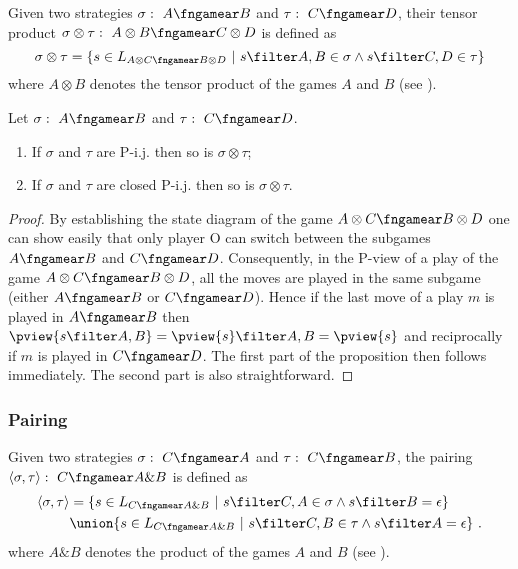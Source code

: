 Given two strategies $\sigma :\ A
\fngamear B$  and $\tau :\ C\fngamear D$, their tensor product
$\sigma \otimes \tau :\ A\otimes B \fngamear C\otimes D$ is defined
as
$$\sigma \otimes \tau = \{ s \in L_{A\otimes C \fngamear B\otimes
D} \ | \ s \filter A,B \in \sigma \wedge s \filter C,D \in \tau \} $$
 where $A\otimes B$ denotes the tensor product of the games $A$ and $B$ (see \cite{abramsky:game-semantics-tutorial}).
\begin{proposition}
Let $\sigma :\ A \fngamear B$  and $\tau :\ C\fngamear D$.
\begin{enumerate}
\item If $\sigma$ and $\tau$ are P-i.j.
then so is $\sigma \otimes \tau$;
\item If $\sigma$ and $\tau$ are closed P-i.j. then so is $\sigma \otimes \tau$.
\end{enumerate}
\end{proposition}

\begin{proof}
By establishing the state diagram of the game $A\otimes C \fngamear
B\otimes D$ one can show easily that only player O can switch
between the subgames $A\fngamear B$ and $C\fngamear D$.
Consequently, in the P-view of a play of the game $A\otimes C
\fngamear B\otimes D$, all the moves are played in the same subgame
(either $A\fngamear B$ or $C\fngamear D$). Hence if the last move of
a play $m$ is played in $A\fngamear B$ then $\pview{s\filter A,B} =
\pview{s} \filter A,B = \pview{s}$ and reciprocally if $m$ is played
in $C\fngamear D$. The first part of the proposition then follows
immediately. The second part is also straightforward.
\end{proof}


\subsubsection{Pairing}
Given two strategies $\sigma :\ C \fngamear A$  and $\tau :\
C\fngamear B$, the pairing $\langle \sigma , \tau \rangle :\ C
\fngamear A\& B$ is defined as
\begin{align*}
\langle \sigma , \tau \rangle
    &= \{ s \in L_{C \fngamear A\& B} \ | \ s \filter C,A \in \sigma \wedge s \filter B = \epsilon \} \\
    & \union \{ s \in L_{C \fngamear A\& B} \ | \ s \filter C,B \in \tau \wedge s \filter A = \epsilon \}
\ .
\end{align*}
 where $A\& B$ denotes the product of the games $A$ and $B$ (see \cite{abramsky:game-semantics-tutorial}).

